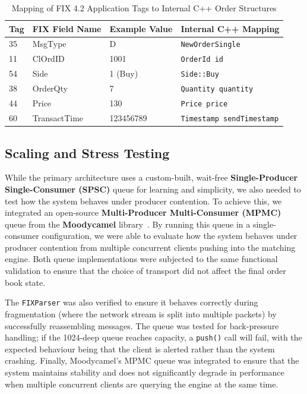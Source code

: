 \begin{table}[htbp]
    \centering
    \small
    \begin{tabular}{llll}
        \toprule
        \textbf{Tag} & \textbf{FIX Field Name} & \textbf{Example Value} & \textbf{Internal C++ Mapping} \\
        \midrule
        35 & MsgType & D & \texttt{NewOrderSingle} \\
        11 & ClOrdID & 1001 & \texttt{OrderId id} \\
        54 & Side & 1 (Buy) & \texttt{Side::Buy} \\
        38 & OrderQty & 7 & \texttt{Quantity quantity} \\
        44 & Price & 130 & \texttt{Price price} \\
        60 & TransactTime & 123456789 & \texttt{Timestamp sendTimestamp} \\
        \bottomrule
    \end{tabular}
    \caption{Mapping of FIX 4.2 Application Tags to Internal C++ Order Structures}
    \label{tab:fix_mapping}
\end{table}

\subsection{Scaling and Stress Testing}
While the primary architecture uses a custom-built, wait-free \textbf{Single-Producer 
Single-Consumer (SPSC)} queue for learning and simplicity, we also needed to 
test how the system behaves under producer contention. To achieve this, we 
integrated an open-source \textbf{Multi-Producer Multi-Consumer (MPMC)} queue 
from the \textbf{Moodycamel} library~\citep{moodycamel_concurrentqueue}. By 
running this queue in a single-consumer configuration, we were able to evaluate 
how the system behaves under producer contention from multiple concurrent 
clients pushing into the matching engine. Both queue implementations were 
subjected to the same functional validation to ensure that the choice of 
transport did not affect the final order book state.

The \texttt{FIXParser} was also verified to ensure it behaves correctly during 
fragmentation (where the network stream is split into multiple packets) by 
successfully reassembling messages. The queue was tested for back-pressure 
handling; if the 1024-deep queue reaches capacity, a \texttt{push()} call will 
fail, with the expected behaviour being that the client is alerted rather than 
the system crashing. Finally, Moodycamel's MPMC queue was integrated to ensure 
that the system maintains stability and does not significantly degrade in 
performance when multiple concurrent clients are querying the engine at the 
same time.

